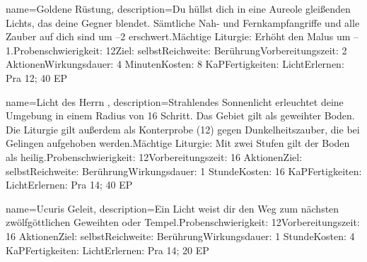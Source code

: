 {
    name={Goldene Rüstung},
    description={Du hüllst dich in eine Aureole gleißenden Lichts, das deine Gegner blendet. Sämtliche Nah- und Fernkampfangriffe und alle Zauber auf dich sind um –2 erschwert.\newline Mächtige Liturgie: Erhöht den Malus um –1.\newline Probenschwierigkeit: 12\newline Ziel: selbst\newline Reichweite: Berührung\newline Vorbereitungszeit: 2 Aktionen\newline Wirkungsdauer: 4 Minuten\newline Kosten: 8 KaP\newline Fertigkeiten: Licht\newline Erlernen: Pra 12; 40 EP}
}


{
    name={Licht des Herrn },
    description={Strahlendes Sonnenlicht erleuchtet deine Umgebung in einem Radius von 16 Schritt. Das Gebiet gilt als geweihter Boden. Die Liturgie gilt außerdem als Konterprobe (12) gegen Dunkelheitszauber, die bei Gelingen aufgehoben werden.\newline Mächtige Liturgie: Mit zwei Stufen gilt der Boden als heilig.\newline Probenschwierigkeit: 12\newline Vorbereitungszeit: 16 Aktionen\newline Ziel: selbst\newline Reichweite: Berührung\newline Wirkungsdauer: 1 Stunde\newline Kosten: 16 KaP\newline Fertigkeiten: Licht\newline Erlernen: Pra 14; 40 EP}
}


{
    name={Ucuris Geleit},
    description={Ein Licht weist dir den Weg zum nächsten zwölfgöttlichen Geweihten oder Tempel.\newline Probenschwierigkeit: 12\newline Vorbereitungszeit: 16 Aktionen\newline Ziel: selbst\newline Reichweite: Berührung\newline Wirkungsdauer: 1 Stunde\newline Kosten: 4 KaP\newline Fertigkeiten: Licht\newline Erlernen: Pra 14; 20 EP}
}


